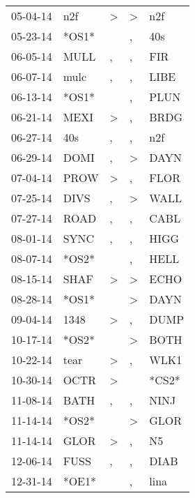 \begin{supertabular}{lllll}
 05-04-14 &    n2f &     \textgreater &  \textgreater &    n2f \\
 05-23-14 &  *OS1* &                  &             , &    40s \\
 06-05-14 &   MULL &                , &             , &    FIR \\
 06-07-14 &   mulc &                , &             , &   LIBE \\
 06-13-14 &  *OS1* &                  &             , &   PLUN \\
 06-21-14 &   MEXI &     \textgreater &             , &   BRDG \\
 06-27-14 &    40s &                , &             , &    n2f \\
 06-29-14 &   DOMI &                , &  \textgreater &   DAYN \\
 07-04-14 &   PROW &     \textgreater &             , &   FLOR \\
 07-25-14 &   DIVS &                , &  \textgreater &   WALL \\
 07-27-14 &   ROAD &                , &             , &   CABL \\
 08-01-14 &   SYNC &                , &             , &   HIGG \\
 08-07-14 &  *OS2* &                  &             , &   HELL \\
 08-15-14 &   SHAF &     \textgreater &  \textgreater &   ECHO \\
 08-28-14 &  *OS1* &                  &  \textgreater &   DAYN \\
 09-04-14 &   1348 &     \textgreater &             , &   DUMP \\
 10-17-14 &  *OS2* &                  &  \textgreater &   BOTH \\
 10-22-14 &   tear &     \textgreater &             , &   WLK1 \\
 10-30-14 &   OCTR &     \textgreater &               &  *CS2* \\
 11-08-14 &   BATH &                , &             , &   NINJ \\
 11-14-14 &  *OS2* &                  &  \textgreater &   GLOR \\
 11-14-14 &   GLOR &     \textgreater &             , &     N5 \\
 12-06-14 &   FUSS &                , &             , &   DIAB \\
 12-31-14 &  *OE1* &                  &             , &   lina \\

\end{supertabular}
